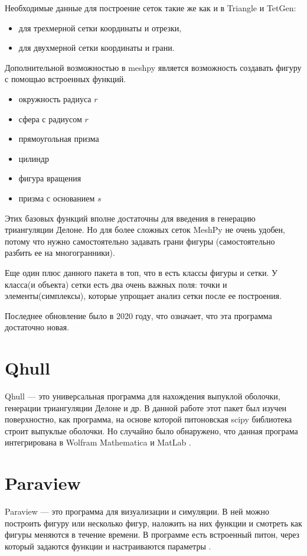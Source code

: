 Необходимые данные для построение сеток такие же как и в Triangle и TetGen:
\begin{itemize}
    \item для трехмерной сетки координаты и отрезки, 
    \item для двухмерной сетки координаты и грани.
\end{itemize}

Дополнительной возможностью в meshpy является возможность создавать фигуру с помощью встроенных функций.
\begin{itemize}
    \item окружность радиуса $r$
    \item сфера с радиусом $r$
    \item прямоугольная призма 
    \item цилиндр
    \item фигура вращения 
    \item призма с основанием $s$
\end{itemize}
\cite{meshpy}

Этих базовых функций вполне достаточны для введения в генерацию триангуляции Делоне. Но для более сложных сеток MeshPy не очень удобен, потому что нужно самостоятельно задавать грани фигуры (самостоятельно разбить ее на многогранники).

Еще один плюс данного пакета в топ, что в есть классы фигуры и сетки. У класса(и объекта) сетки есть два очень важных поля: точки и элементы(симплексы), которые упрощает анализ сетки после ее построения.  

Последнее обновление было в 2020 году, что означает, что эта программа достаточно новая. 
\section{Qhull}

Qhull --- это универсальная программа для нахождения выпуклой оболочки, генерации триангуляции Делоне и др. В данной работе этот пакет был изучен поверхностно, как программа, на основе которой питоновская scipy библиотека строит выпуклые оболочки. Но случайно было обнаружено, что данная програма интегрирована в Wolfram Mathematica и MatLab \cite{qhull}. 


\section{Paraview}
Paraview --- это программа для визуализации и симуляции. В ней можно построить фигуру или несколько фигур, наложить на них функции и смотреть как фигуры меняются в течение времени. В программе есть встроенный питон, через который задаются функции и настраиваются параметры \cite{paraview}.

